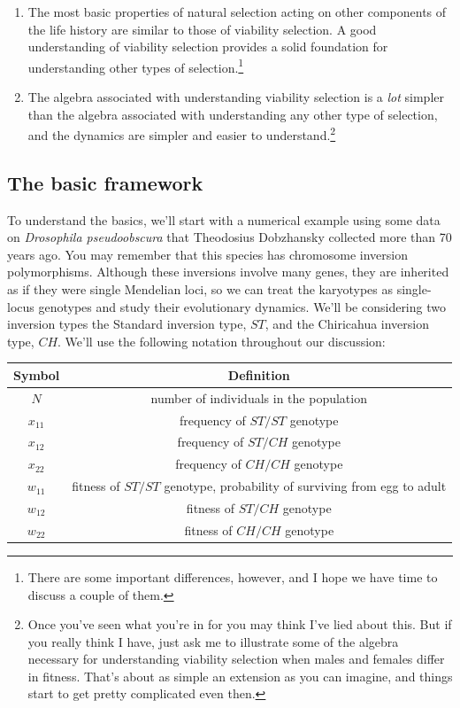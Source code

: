 \begin{enumerate}

\item The most basic properties of natural selection acting on other
  components of the life history are similar to those of viability
  selection. A good understanding of viability selection provides a
  solid foundation for understanding other types of
  selection.\footnote{There are some important differences, however,
    and I hope we have time to discuss a couple of them.}

\item The algebra associated with understanding viability selection is
  a {\it lot\/} simpler than the algebra associated with understanding
  any other type of selection, and the dynamics are simpler and
  easier to understand.\footnote{Once you've seen what you're in for
    you may think I've lied about this. But if you really think I
    have, just ask me to illustrate some of the algebra necessary for
    understanding viability selection when males and females differ in
    fitness. That's about as simple an extension as you can imagine,
    and things start to get pretty complicated even then.}

\end{enumerate}

\subsection*{The basic framework}

To understand the basics, we'll start with a numerical example using
some data on {\it Drosophila pseudoobscura\/} that Theodosius
Dobzhansky collected more than 70 years ago. You may remember that
this species has chromosome inversion polymorphisms. Although these
inversions involve many genes, they are inherited as if they were
single Mendelian loci, so we can treat the karyotypes as single-locus
genotypes and study their evolutionary dynamics. We'll be considering
two inversion types the Standard inversion type, $ST$, and the
Chiricahua inversion type, $CH$. We'll use the following notation
throughout our discussion:

\begin{center}
\begin{tabular}{cc}
\hline\hline
Symbol  & Definition \\
\hline
$N$      & number of individuals in the population \\
$x_{11}$ & frequency of $ST/ST$ genotype \\
$x_{12}$ & frequency of $ST/CH$ genotype \\
$x_{22}$ & frequency of $CH/CH$ genotype \\
$w_{11}$ & fitness of $ST/ST$ genotype, probability of surviving from
           egg to adult \\
$w_{12}$ & fitness of $ST/CH$ genotype \\
$w_{22}$ & fitness of $CH/CH$ genotype \\
\hline
\end{tabular}
\end{center}

